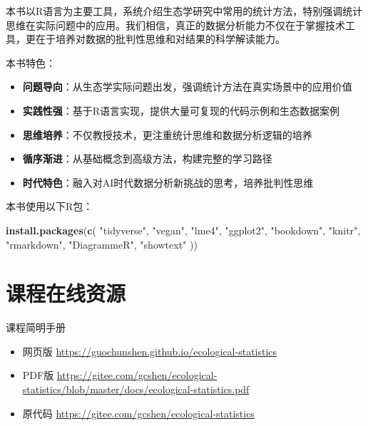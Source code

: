 \documentclass[
]{book}
\newenvironment{Shaded}{\begin{snugshade}}{\end{snugshade}}
\newcommand{\FunctionTok}[1]{\textcolor[rgb]{0.13,0.29,0.53}{\textbf{#1}}}
\newcommand{\NormalTok}[1]{#1}
\newcommand{\StringTok}[1]{\textcolor[rgb]{0.31,0.60,0.02}{#1}}
\providecommand{\tightlist}{%
  \setlength{\itemsep}{0pt}\setlength{\parskip}{0pt}}
\begin{document}
本书以R语言为主要工具，系统介绍生态学研究中常用的统计方法，特别强调统计思维在实际问题中的应用。我们相信，真正的数据分析能力不仅在于掌握技术工具，更在于培养对数据的批判性思维和对结果的科学解读能力。

本书特色：

\begin{itemize}
\tightlist
\item
  \textbf{问题导向}：从生态学实际问题出发，强调统计方法在真实场景中的应用价值
\item
  \textbf{实践性强}：基于R语言实现，提供大量可复现的代码示例和生态数据案例
\item
  \textbf{思维培养}：不仅教授技术，更注重统计思维和数据分析逻辑的培养
\item
  \textbf{循序渐进}：从基础概念到高级方法，构建完整的学习路径
\item
  \textbf{时代特色}：融入对AI时代数据分析新挑战的思考，培养批判性思维
\end{itemize}

本书使用以下R包：

\begin{Shaded}
\begin{Highlighting}[]
\FunctionTok{install.packages}\NormalTok{(}\FunctionTok{c}\NormalTok{(}
  \StringTok{"tidyverse"}\NormalTok{, }\StringTok{"vegan"}\NormalTok{, }\StringTok{"lme4"}\NormalTok{, }\StringTok{"ggplot2"}\NormalTok{, }
  \StringTok{"bookdown"}\NormalTok{, }\StringTok{"knitr"}\NormalTok{, }\StringTok{"rmarkdown"}\NormalTok{, }\StringTok{"DiagrammeR"}\NormalTok{,}
  \StringTok{"showtext"}
\NormalTok{))}
\end{Highlighting}
\end{Shaded}

\hypertarget{ux8bfeux7a0bux5728ux7ebfux8d44ux6e90}{%
\section{课程在线资源}\label{ux8bfeux7a0bux5728ux7ebfux8d44ux6e90}}

课程简明手册

\begin{itemize}
\tightlist
\item
  网页版 \url{https://guochunshen.github.io/ecological-statistics}
\item
  PDF版 \url{https://gitee.com/gcshen/ecological-statistics/blob/master/docs/ecological-statistics.pdf}
\item
  原代码 \url{https://gitee.com/gcshen/ecological-statistics}
\end{itemize}
\end{document}
